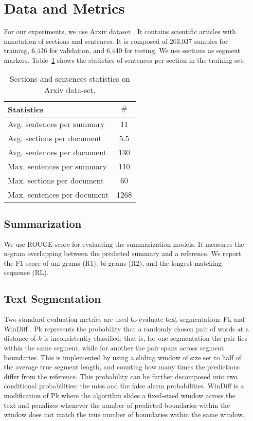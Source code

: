\documentclass[sigconf]{acmart}
\begin{document}
\section{Data and Metrics}\label{sec:data}
For our experiments, we use Arxiv dataset \cite{cohan-etal-2018-discourse}. It contains scientific articles with annotation of sections and sentences. It is composed of 203,037 samples for training, 6,436 for validation, and 6,440 for testing. We use sections as segment markers. Table~\ref{tab:arxiv} shows the statistics of sentences per section in the training set.

\begin{table}
	\centering
\begin{tabular}{l  c } 
	\toprule
	\textbf{Statistics} & \textbf{$\#$}\\ \hline
    Avg. sentences per summary&	11\\
    Avg. sections per document&	5.5\\
    Avg. sentences per document&	130\\
    Max. sentences per summary&	110\\
    Max. sections per document&	60\\
    Max. sentences per document&	1268\\
    \bottomrule
   \end{tabular} 
\caption{Sections and sentences statistics on Arxiv data-set.}
	\label{tab:arxiv}
\end{table}

\subsection{Summarization} We use ROUGE score \cite{lin-2004-rouge} for evaluating the summarization models. It measures the n-gram overlapping between the predicted summary and a reference. We report the F1 score of uni-grams (R1), bi-grams (R2), and the longest matching sequence (RL).

\subsection{Text Segmentation} Two standard evaluation metrics are used to evaluate text segmentation: Pk \cite{beeferman1999statistical} and WinDiff \cite{pevzner-hearst-2002-critique}. Pk represents the probability that a randomly chosen pair of words at a distance of $k$ is inconsistently classified; that is, for one segmentation the pair lies within the same segment, while for another the pair spans across segment boundaries. This is implemented by using a sliding window of size set to half of the average true segment length, and counting how many times the predictions differ from the reference. This probability can be further decomposed into two conditional probabilities: the miss and the false alarm probabilities. WinDiff is a modification of Pk where the algorithm slides a fixed-sized window across the text and penalizes whenever the number of predicted boundaries within the window does not match the true number of boundaries within the same window.
\end{document}
